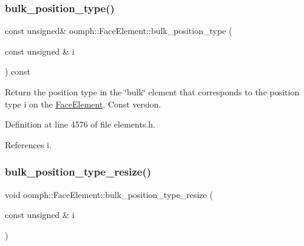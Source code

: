 \mbox{\label{classoomph_1_1FaceElement_aa99f478e771d753e93cc748caf0e5302}} 
\subsubsection{\texorpdfstring{bulk\+\_\+position\+\_\+type()}{bulk\_position\_type()}\hspace{0.1cm}{\footnotesize\ttfamily [2/2]}}
{\footnotesize\ttfamily const unsigned\& oomph\+::\+Face\+Element\+::bulk\+\_\+position\+\_\+type (\begin{DoxyParamCaption}\item[{const unsigned \&}]{i }\end{DoxyParamCaption}) const\hspace{0.3cm}{\ttfamily [inline]}}



Return the position type in the \char`\"{}bulk\char`\"{} element that corresponds to the position type i on the \hyperlink{classoomph_1_1FaceElement}{Face\+Element}. Const version. 



Definition at line 4576 of file elements.\+h.



References i.

\mbox{\label{classoomph_1_1FaceElement_a7e6ac88c4dbc58f16e9c7ca60b6b9c0f}} 
\subsubsection{\texorpdfstring{bulk\+\_\+position\+\_\+type\+\_\+resize()}{bulk\_position\_type\_resize()}}
{\footnotesize\ttfamily void oomph\+::\+Face\+Element\+::bulk\+\_\+position\+\_\+type\+\_\+resize (\begin{DoxyParamCaption}\item[{const unsigned \&}]{i }\end{DoxyParamCaption})\hspace{0.3cm}{\ttfamily [inline]}}



